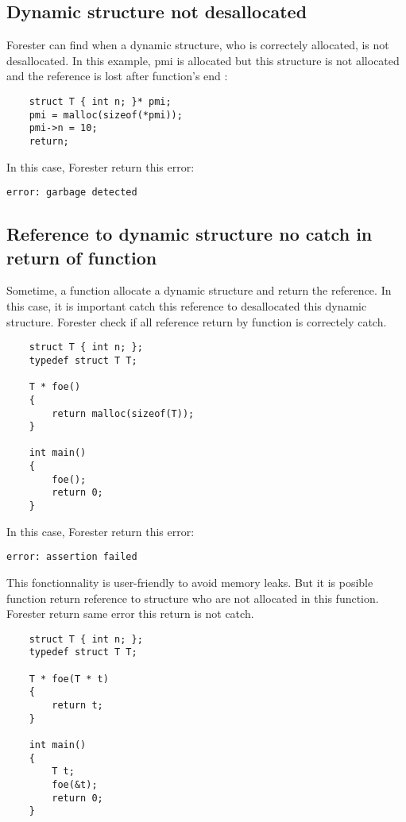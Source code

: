 	\subsection{Dynamic structure not desallocated}
	
Forester can find when a dynamic structure, who is correctely allocated, is not desallocated. In this example, pmi is allocated but this structure is not allocated and the reference is lost after function's end :

\begin{lstlisting}
	struct T { int n; }* pmi;
	pmi = malloc(sizeof(*pmi));
	pmi->n = 10;
	return;
\end{lstlisting}
\bigskip

In this case, Forester return this error:

\begin{lstlisting}
error: garbage detected
\end{lstlisting}
\bigskip

	\subsection{Reference to dynamic structure no catch in return of function}
	
Sometime, a function allocate a dynamic structure and return the reference. In this case, it is important catch this reference to desallocated this dynamic structure. Forester check if all reference return by function is correctely catch.

\begin{lstlisting}
	struct T { int n; };
	typedef struct T T;

	T * foe()
	{
		return malloc(sizeof(T));
	}

	int main()
	{
		foe();
		return 0;
	}
\end{lstlisting}
\bigskip

In this case, Forester return this error:

\begin{lstlisting}
error: assertion failed
\end{lstlisting}
\bigskip

This fonctionnality is user-friendly to avoid memory leaks. But it is posible function return reference to structure who are not allocated in this function. Forester return same error this return is not catch.

\begin{lstlisting}
	struct T { int n; };
	typedef struct T T;

	T * foe(T * t)
	{
		return t;
	}

	int main()
	{
		T t;
		foe(&t);
		return 0;
	}
\end{lstlisting}
\bigskip